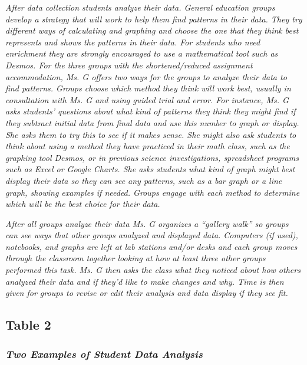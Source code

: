 \documentclass[11pt]{sig-alternate}
\begin{document}
\begin{large}
\textit{After data collection students analyze their data. General education groups develop a strategy that will work to help them find patterns in their data. They try different ways of calculating and graphing and choose the one that they think best represents and shows the patterns in their data. For students who need enrichment they are strongly encouraged to use a mathematical tool such as Desmos. For the three groups with the shortened/reduced assignment accommodation, Ms. G offers two ways for the groups to analyze their data to find patterns. Groups choose which method they think will work best, usually in consultation with Ms. G and using guided trial and error. For instance, Ms. G asks students’ questions about what kind of patterns they think they might find if they subtract initial data from final data and use this number to graph or display. She asks them to try this to see if it makes sense. She might also ask students to think about using a method they have practiced in their math class, such as the graphing tool Desmos, or in previous science investigations, spreadsheet programs such as Excel or Google Charts. She asks students what kind of graph might best display their data so they can see any patterns, such as a bar graph or a line graph, showing examples if needed. Groups engage with each method to determine which will be the best choice for their data.}

\textit{After all groups analyze their data Ms. G organizes a “gallery walk” so groups can see ways that other groups analyzed and displayed data. Computers (if used), notebooks, and graphs are left at lab stations and/or desks and each group moves through the classroom together looking at how at least three other groups performed this task. Ms. G then asks the class what they noticed about how others analyzed their data and if they’d like to make changes and why. Time is then given for groups to revise or edit their analysis and data display if they see fit.}

\subsection*{Table 2}
\subsubsection*{\textit{\textbf{Two Examples of Student Data Analysis}}}


\end{large}
\end{document}
